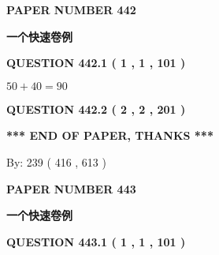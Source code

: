 \documentclass{ctexart}
\begin{document}
   
 {\textbf{ \Large{ PAPER NUMBER  442  }}}
   
   
\vspace{0.2in}
   
   
   
   
   
   
 \vspace{0.2in}
{\LARGE {\textbf{ 一个快速卷例}}}
   
   
  
\vspace{0.2in}
  
{\textbf{\Large{QUESTION
442.1 
 ( 1 , 1 , 101 )
}}}
  
  
 
 

$ %
50 +  %
40=   %
90$
 
 
  
\vspace{0.2in}
  
{\textbf{\Large{QUESTION
442.2 
 ( 2 , 2 , 201 )
}}}
  
  
   
   
 \vspace{0.2in}
 
   
   
   
   
\vspace{1.0in} 
{\textbf{\large{ *** END OF PAPER, THANKS *** }}} 
   
   
\hspace{1.0in} By: 
 239 ( 416 ,  613 )
   
   
   
   
\newpage 
\setcounter{page}{ 
   443001 } 
   
   
   
   
 {\textbf{ \Large{ PAPER NUMBER  443  }}}
   
   
\vspace{0.2in}
   
   
   
   
   
   
 \vspace{0.2in}
{\LARGE {\textbf{ 一个快速卷例}}}
   
   
  
\vspace{0.2in}
  
{\textbf{\Large{QUESTION
443.1 
 ( 1 , 1 , 101 )
}}}
  
\end{document}

